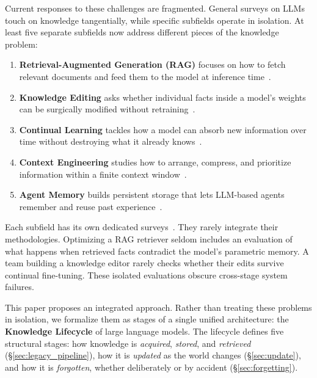 \documentclass[10pt]{article}
\begin{document}
Current responses to these challenges are fragmented. General surveys on LLMs~\citep{zhao2023surveyllm, wang2024agents} touch on knowledge tangentially, while specific subfields operate in isolation. At least five separate subfields now address different pieces of the knowledge problem:

\begin{enumerate}[leftmargin=*]
  \item \textbf{Retrieval-Augmented Generation (RAG)} focuses on how to fetch relevant documents and feed them to the model at inference time~\citep{lewis2020rag, guu2020realm, gao2023ragsurvey}.
  \item \textbf{Knowledge Editing} asks whether individual facts inside a model's weights can be surgically modified without retraining~\citep{meng2022rome, meng2023memit, yao2023editingsurvey}.
  \item \textbf{Continual Learning} tackles how a model can absorb new information over time without destroying what it already knows~\citep{kirkpatrick2017ewc, ke2023continual, wu2024continual}.
  \item \textbf{Context Engineering} studies how to arrange, compress, and prioritize information within a finite context window~\citep{liu2024lost}.
  \item \textbf{Agent Memory} builds persistent storage that lets LLM-based agents remember and reuse past experience~\citep{park2023generative, packer2023memgpt, hu2025agentmemory}.
\end{enumerate}

Each subfield has its own dedicated surveys~\citep{gao2023ragsurvey, mialon2023augmented, hu2025agentmemory, wu2025humanmemory}. They rarely integrate their methodologies. Optimizing a RAG retriever seldom includes an evaluation of what happens when retrieved facts contradict the model's parametric memory. A team building a knowledge editor rarely checks whether their edits survive continual fine-tuning. These isolated evaluations obscure cross-stage system failures.

This paper proposes an integrated approach. Rather than treating these problems in isolation, we formalize them as stages of a single unified architecture: the \textbf{Knowledge Lifecycle} of large language models. The lifecycle defines five structural stages: how knowledge is \textit{acquired}, \textit{stored}, and \textit{retrieved} (\S\ref{sec:legacy_pipeline}), how it is \textit{updated} as the world changes (\S\ref{sec:update}), and how it is \textit{forgotten}, whether deliberately or by accident (\S\ref{sec:forgetting}).
\end{document}
